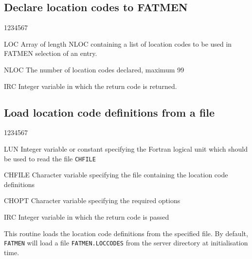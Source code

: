 \subsection{Declare location codes to FATMEN}
\begin{DLtt}{1234567}
\item[LOC]
Array of length NLOC containing a list of location codes
to be used in FATMEN selection of an entry.
\item [NLOC]
The number of location codes declared, maximum 99
\item[IRC]
Integer variable in which the return code is returned.
\end{DLtt}
\subsection{Load location code definitions from a file}
\begin{DLtt}{1234567}
\item[LUN]Integer variable or constant specifying the Fortran
logical unit which should be used to read the file {\tt CHFILE}
\item[CHFILE]Character variable specifying the file containing
the location code definitions
\item[CHOPT]Character variable specifying the required options
\item[IRC]Integer variable in which the return code is passed
\end{DLtt}
This routine loads the location code definitions from the specified
file. By default, {\tt FATMEN} will load a file {\tt FATMEN.LOCCODES}
from the server directory at initialisation time. 

